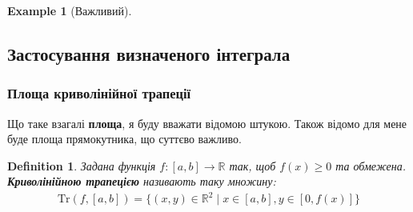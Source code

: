 \documentclass[a4paper, 10pt]{article}
\theoremstyle{theoremdd}
\theoremstyle{theoremdd}
\theoremstyle{theoremdd}
\newtheorem{definition}[theorem]{Definition}
\theoremstyle{theoremdd}
\theoremstyle{theoremdd}
\newtheorem{example}[theorem]{Example}
\theoremstyle{theoremdd}
\theoremstyle{theoremdd}
\theoremstyle{theoremdd}
\theoremstyle{theoremdd}
\begin{document}
\begin{example}[Важливий]

\end{example}

\subsection{Застосування визначеного інтеграла}
\subsubsection{Площа криволінійної трапеції}
Що таке взагалі \textbf{площа}, я буду вважати відомою штукою. Також відомо для мене буде площа прямокутника, що суттєво важливо.

\begin{definition}
Задана функція $f \colon [a,b] \to \mathbb{R}$ так, щоб $f(x) \geq 0$ та обмежена.\\
\textbf{Криволінійною трапецією} називають таку множину:
\begin{align*}
\text{Tr}(f,[a,b]) = \{(x,y) \in \mathbb{R}^2 \mid x \in [a,b], y \in [0, f(x)] \}
\end{align*}
\begin{figure}[H]
\centering
{}
\end{figure}
\end{definition}
\end{document}
